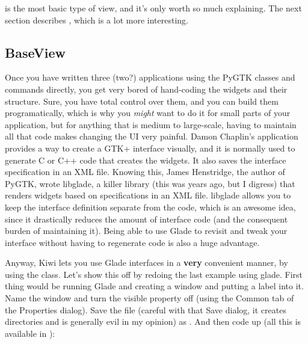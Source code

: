 \documentclass[a4paper]{howto}
\begin{document}
 is the most basic type of view, and it's only worth so
much explaining. The next section describes , which is
a lot more interesting.

\subsection{BaseView}

Once you have written three (two?) applications using the PyGTK classes
and commands directly, you get very bored of hand-coding the widgets and
their structure. Sure, you have total control over them, and you can
build them programatically, which is why you {\it might} want to do it
for small parts of your application, but for anything that is medium to
large-scale, having to maintain all that code makes changing the UI very
painful. Damon Chaplin's application
 provides a way to create a
GTK+ interface visually, and it is normally used to generate C or C++
code that creates the widgets. It also saves the interface specification
in an XML file. Knowing this, James Henstridge, the author of PyGTK,
wrote libglade, a killer library (this was years ago, but I digress)
that renders widgets based on specifications in an XML file. libglade
allows you to keep the interface definition separate from the code,
which is an awesome idea, since it drastically reduces the amount of
interface code (and the consequent burden of maintaining it). Being able
to use Glade to revisit and tweak your interface without having to
regenerate code is also a huge advantage.

Anyway, Kiwi lets you use Glade interfaces in a {\bf very} convenient
manner, by using the  class. Let's show this off by
redoing the last example using glade. First thing would be running Glade
and creating a window and putting a label into it. Name the window
 and turn the visible property off (using the Common tab of
the Properties dialog). Save the file (careful with that Save dialog, it
creates directories and is generally evil in my opinion) as
. And then code up  (all this is
available in ):


\end{document}
